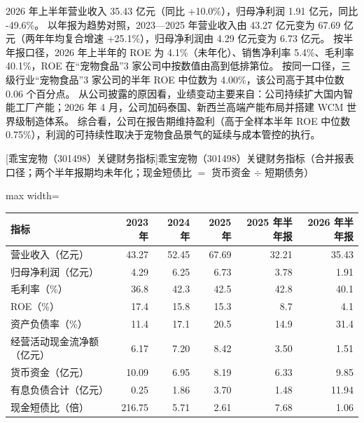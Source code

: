  2026 年上半年营业收入 35.43 亿元（同比 +10.0\%），归母净利润 1.91 亿元，同比 -49.6\%。 以年报为趋势对照，2023---2025 年营业收入由 43.27 亿元变为 67.69 亿元（两年年均复合增速 +25.1\%），归母净利润由 4.29 亿元变为 6.73 亿元。 按半年报口径，2026 年上半年的 ROE 为 4.1\%（未年化）、销售净利率 5.4\%、毛利率 40.1\%，ROE 在“宠物食品”3 家公司中按数值由高到低排第位。 按同一口径，三级行业“宠物食品”3 家公司的半年 ROE 中位数为 4.00\%，该公司高于其中位数 0.06 个百分点。 从公司披露的原因看，业绩变动主要来自：公司持续扩大国内智能工厂产能；2026 年 4 月，公司加码泰国、新西兰高端产能布局并搭建 WCM 世界级制造体系。 综合看，公司在报告期维持盈利（高于全样本半年 ROE 中位数 0.75\%），利润的可持续性取决于宠物食品景气的延续与成本管控的执行。

\begin{center}\small\setlength{\tabcolsep}{3.4pt}
[乖宝宠物（301498）关键财务指标]{乖宝宠物（301498）关键财务指标（合并报表口径；两个半年报期均未年化；现金短债比 $=$ 货币资金 $\div$ 短期债务）}
\begin{adjustbox}{max width=\textwidth}
\begin{tabular}{@{}lrrrrr@{}}
\toprule
指标 & 2023 年 & 2024 年 & 2025 年 & 2025 年半年报 & 2026 年半年报 \\
\midrule
营业收入（亿元） & 43.27 & 52.45 & 67.69 & 32.21 & 35.43 \\
归母净利润（亿元） & 4.29 & 6.25 & 6.73 & 3.78 & 1.91 \\
毛利率（\%） & 36.8 & 42.3 & 42.5 & 42.8 & 40.1 \\
ROE（\%） & 17.4 & 15.8 & 15.3 & 8.7 & 4.1 \\
资产负债率（\%） & 11.4 & 17.1 & 20.5 & 14.9 & 31.4 \\
经营活动现金流净额（亿元） & 6.17 & 7.20 & 8.42 & 3.50 & 1.51 \\
货币资金（亿元） & 10.09 & 6.95 & 8.19 & 6.33 & 9.85 \\
有息负债合计（亿元） & 0.25 & 1.86 & 3.70 & 1.48 & 11.94 \\
现金短债比（倍） & 216.75 & 5.71 & 2.61 & 7.68 & 1.06 \\
\bottomrule
\end{tabular}
\end{adjustbox}
\end{center}

